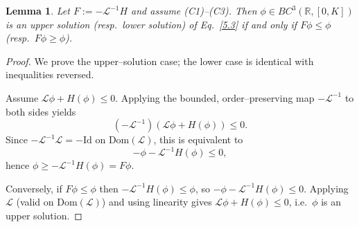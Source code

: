 \documentclass[12pt,letterpaper]{amsart}
\newtheorem{lemma}[theorem]{Lemma}
\theoremstyle{definition}
\theoremstyle{remark}
\numberwithin{equation}{section}
\begin{document}
 
 
 \begin{lemma}\label{lem:upper-lower-simple}
  	Let $F:=-\mathcal L^{-1}H$ and assume (C1)--(C3). 
 	Then $\phi\in BC^3(\mathbb R,[0,K])$ is an upper solution (resp.\ lower solution) 
 	of Eq.~\eqref{5.3} if and only if $F\phi \le \phi$ (resp.\ $F\phi \ge \phi$).
 \end{lemma}
 
 
 \begin{proof}
 	We prove the upper–solution case; the lower case is identical with inequalities reversed.
 	
 	Assume $\mathcal L\phi+H(\phi)\le0$. Applying the bounded, order--preserving map $-\mathcal L^{-1}$ to both sides yields
 	\[
 	(-\mathcal L^{-1})(\mathcal L\phi + H(\phi)) \le 0.
 	\]
 	Since $-\mathcal L^{-1}\mathcal L = -\mathrm{Id}$ on $\mathrm{Dom}(\mathcal L)$,
 	this is equivalent to
 	\[
 	-\phi - \mathcal L^{-1}H(\phi) \le 0,
 	\]
 	hence $\phi \ge -\mathcal L^{-1}H(\phi)=F\phi$.
 	
 	Conversely, if $F\phi\le\phi$ then $-\mathcal L^{-1}H(\phi)\le\phi$, so
 	$-\phi-\mathcal L^{-1}H(\phi)\le0$. Applying $\mathcal L$ (valid on
 	$\mathrm{Dom}(\mathcal L)$) and using linearity gives $\mathcal L\phi+H(\phi)\le0$,
 	i.e.\ $\phi$ is an upper solution.  
 \end{proof}
 
 
 
 
 
 
 
 
 
 
 
 
 
 
 
\end{document}
